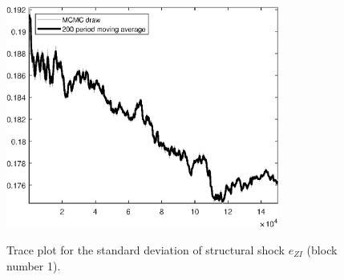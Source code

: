 \begin{figure}[H]
\centering
  \includegraphics[width=0.8\textwidth]{BRS_sectoral_wo_gmf/graphs/TracePlot_SE_e_ZI_blck_1}\\
    \caption{Trace plot for the standard deviation of structural shock ${e_{ZI}}$ (block number 1).}
\end{figure}
